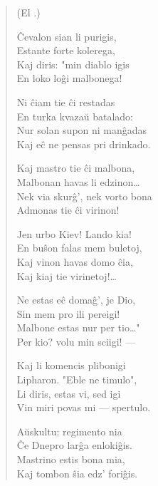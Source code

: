 \begin{verse}
\begin{center}
\footnotesize (El .)
\end{center}
                        \^Cevalon sian li purigis,\\
                        Estante forte kolerega,\\
                        Kaj diris: "min diablo igis\\
                        En loko lo\^gi malbonega!

                        \vin      Ni \^ciam tie \^ci restadas\\
                          \vin    En turka kvaza\u u batalado:\\
                          \vin    Nur solan supon ni man\^gadas\\
                         \vin     Kaj e\^c ne pensas pri drinkado.

                        Kaj mastro tie \^ci malbona,\\
                        Malbonan havas li edzinon\dots\\
                        Nek via skur\^g', nek vorto bona\\
                        Admonas tie \^ci virinon!

                         \vin     Jen urbo Kiev! Lando kia!\\
                         \vin     En bu\^son falas mem buletoj,\\
                         \vin     Kaj vinon havas domo \^cia,\\
                         \vin     Kaj kiaj tie virinetoj!\dots

                        Ne estas e\^c doma\^g', je Dio,\\
                        Sin mem pro ili pereigi!\\
                        Malbone estas nur per tio\dots"\\
                        Per kio? volu min sciigi! ---

                          \vin    Kaj li komencis plibonigi\\
                          \vin    Lipharon. "Eble ne timulo",\\
                          \vin    Li diris, estas vi, sed igi\\
                           \vin   Vin miri povas mi --- spertulo.

                        A\u uskultu: regimento nia\\
                        \^Ce Dnepro lar\^ga enloki\^gis.\\
                        Mastrino estis bona mia,\\
                        Kaj tombon \^sia edz' fori\^gis.


\end{verse}
